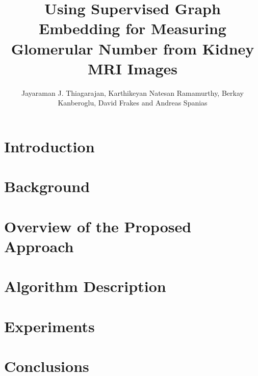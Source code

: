 \documentclass[journal]{IEEEtran}
\begin{document}
\title{Using Supervised Graph Embedding for Measuring Glomerular Number from Kidney MRI Images}
\author{Jayaraman J. Thiagarajan, Karthikeyan Natesan Ramamurthy, Berkay Kanberoglu, David Frakes and Andreas Spanias}
\date{}
\maketitle

\begin{abstract}

\end{abstract}


\section{Introduction}
\label{sec:prob}


\section{Background}
\label{sec:background}


\section{Overview of the Proposed Approach}


\section{Algorithm Description}
\label{sec:algo}


\section{Experiments}
\label{sec:experiments}



\section{Conclusions}
\label{sec:concl}


%
%
\end{document}
